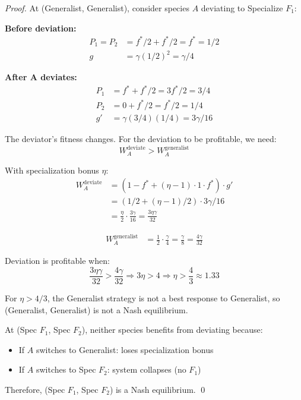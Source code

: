 \documentclass[11pt]{article}
\theoremstyle{definition}
\theoremstyle{remark}
\begin{document}
\begin{proof}
At (Generalist, Generalist), consider species $A$ deviating to Specialize $F_1$:

\textbf{Before deviation:}
\begin{align}
P_1 = P_2 &= f^*/2 + f^*/2 = f^* = 1/2\\
g &= \gamma (1/2)^2 = \gamma/4
\end{align}

\textbf{After A deviates:}
\begin{align}
P_1 &= f^* + f^*/2 = 3f^*/2 = 3/4\\
P_2 &= 0 + f^*/2 = f^*/2 = 1/4\\
g' &= \gamma (3/4)(1/4) = 3\gamma/16
\end{align}

The deviator's fitness changes. For the deviation to be profitable, we need:
\begin{equation}
W_A^{\text{deviate}} > W_A^{\text{generalist}}
\end{equation}

With specialization bonus $\eta$:
\begin{align}
W_A^{\text{deviate}} &= \left(1 - f^* + (\eta-1) \cdot 1 \cdot f^*\right) \cdot g'\\
&= \left(1/2 + (\eta-1)/2\right) \cdot 3\gamma/16\\
&= \frac{\eta}{2} \cdot \frac{3\gamma}{16} = \frac{3\eta\gamma}{32}
\end{align}

\begin{align}
W_A^{\text{generalist}} &= \frac{1}{2} \cdot \frac{\gamma}{4} = \frac{\gamma}{8} = \frac{4\gamma}{32}
\end{align}

Deviation is profitable when:
\begin{equation}
\frac{3\eta\gamma}{32} > \frac{4\gamma}{32} \Rightarrow 3\eta > 4 \Rightarrow \eta > \frac{4}{3} \approx 1.33
\end{equation}

For $\eta > 4/3$, the Generalist strategy is not a best response to Generalist, so (Generalist, Generalist) is not a Nash equilibrium.

At (Spec $F_1$, Spec $F_2$), neither species benefits from deviating because:
\begin{itemize}
    \item If $A$ switches to Generalist: loses specialization bonus
    \item If $A$ switches to Spec $F_2$: system collapses (no $F_1$)
\end{itemize}

Therefore, (Spec $F_1$, Spec $F_2$) is a Nash equilibrium. \qed
\end{proof}
\end{document}

